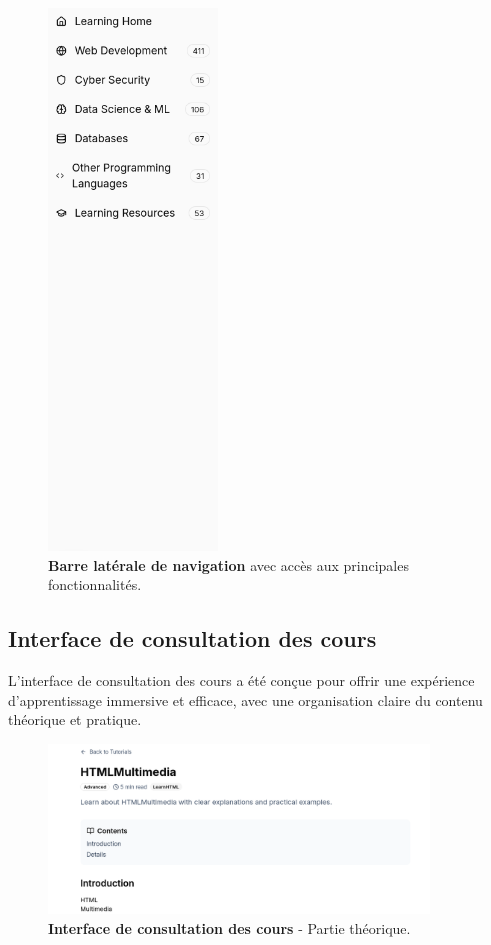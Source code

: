 \begin{figure}[H]
  \centering
  \includegraphics[width=0.4\textwidth,keepaspectratio]{week_3_img/sidebare.png}
  \caption{\textbf{Barre latérale de navigation} avec accès aux principales fonctionnalités.}
  \label{fig:sidebar}
\end{figure}

\subsection{Interface de consultation des cours}

L'interface de consultation des cours a été conçue pour offrir une expérience d'apprentissage immersive et efficace, avec une organisation claire du contenu théorique et pratique.

\begin{figure}[H]
  \centering
  \includegraphics[width=0.9\textwidth,keepaspectratio]{week_3_img/part1.png}
  \caption{\textbf{Interface de consultation des cours} - Partie théorique.}
  \label{fig:course_theory}
\end{figure}

